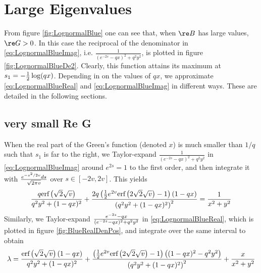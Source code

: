 \section{Large Eigenvalues}\label{sec:eigen_M}
From figure \ref{fig:LognormalBlue} one can see that, when $\re B$ has
large values, $\re G > 0$. In this case the reciprocal of the 
denominator in \eqref{eq:LognormalBlueImag}, i.e. $\frac{1}{(e^{-2s} -
  qx)^2 + q^2   y^2}$, is plotted in figure \ref{fig:LognormalBlueDe2}.
Clearly, this function attains its maximum at $s_1 = -{1 \over
  2}\log(qx)$. Depending in on the values of $qx$, we approximate
\eqref{eq:LognormalBlueReal} and \eqref{eq:LognormalBlueImag} in
different ways. These are detailed in the following sections.

\subsection{very small Re G}
When the real part of the Green's function (denoted $x$) is much smaller than $1/q$
such that $s_1$ is far to the right, we Taylor-expand $\frac{1}{(e^{-2s} -
  qx)^2 + q^2   y^2}$ in \eqref{eq:LognormalBlueImag} around
$e^{2s}=1$ to the first order, and then integrate it with $e^{-s^2/2v}
ds \over \sqrt{2\pi v}$ over $s \in [-2v,2v]$. This yields
\begin{equation}\label{eq:eigmax1}
\frac{q \text{erf}\left(\sqrt{2} \sqrt{v}\right)}{q^2 y^2+(1-q
  x)^2}+\frac{2 q \left(\frac{1}{2} e^{2 v} \text{erf}\left(2 \sqrt{2}
      \sqrt{v}\right)-1\right) (1-q x)}{\left(q^2 y^2+(1-q
    x)^2\right)^2} = {1 \over x^2 + y^2}
\end{equation}
Similarly, we Taylor-expand $e^{-2s}-qx \over (e^{-2s}-qx)^2 + q^2y^2$
in \eqref{eq:LognormalBlueReal}, which is plotted in figure
\ref{fig:BlueRealDenPos}, and integrate over the same interval 
to obtain
\begin{equation}\label{eq:eigmax2}
\lambda = \frac{\text{erf}\left(\sqrt{2} \sqrt{v}\right) (1-q x)}{q^2 y^2+(1-q
    x)^2}+\frac{\left(\frac{1}{2} e^{2 v} \text{erf}\left(2 \sqrt{2}
        \sqrt{v}\right)-1\right) \left((1-q x)^2-q^2
      y^2\right)}{\left(q^2 y^2+(1-q x)^2\right)^2} + {x \over x^2 + y^2}
\end{equation}
